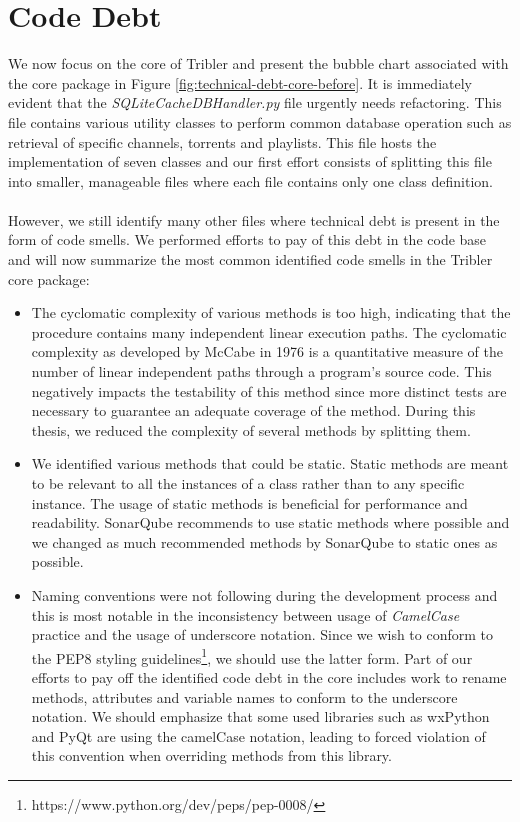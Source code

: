 \section{Code Debt}
We now focus on the core of Tribler and present the bubble chart associated with the core package in Figure \ref{fig:technical-debt-core-before}. It is immediately evident that the \emph{SQLiteCacheDBHandler.py} file urgently needs refactoring. This file contains various utility classes to perform common database operation such as retrieval of specific channels, torrents and playlists. This file hosts the implementation of seven classes and our first effort consists of splitting this file into smaller, manageable files where each file contains only one class definition.\\\\
However, we still identify many other files where technical debt is present in the form of code smells. We performed efforts to pay of this debt in the code base and will now summarize the most common identified code smells in the Tribler core package:
\begin{itemize}
	\item The cyclomatic complexity of various methods is too high, indicating that the procedure contains many independent linear execution paths. The cyclomatic complexity as developed by McCabe in 1976\cite{mccabe1976complexity} is a quantitative measure of the number of linear independent paths through a program's source code. This negatively impacts the testability of this method since more distinct tests are necessary to guarantee an adequate coverage of the method. During this thesis, we reduced the complexity of several methods by splitting them.
	\item We identified various methods that could be static. Static methods are meant to be relevant to all the instances of a class rather than to any specific instance. The usage of static methods is beneficial for performance and readability. SonarQube recommends to use static methods where possible and we changed as much recommended methods by SonarQube to static ones as possible.
	\item Naming conventions were not following during the development process and this is most notable in the inconsistency between usage of \emph{CamelCase} practice and the usage of underscore notation. Since we wish to conform to the PEP8 styling guidelines\footnote{https://www.python.org/dev/peps/pep-0008/}, we should use the latter form. Part of our efforts to pay off the identified code debt in the core includes work to rename methods, attributes and variable names to conform to the underscore notation. We should emphasize that some used libraries such as wxPython and PyQt are using the camelCase notation, leading to forced violation of this convention when overriding methods from this library.
\end{itemize}
